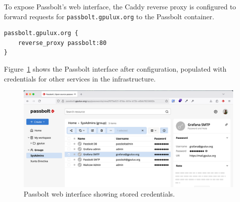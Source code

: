 To expose Passbolt's web interface, the Caddy reverse proxy is configured to forward requests for \texttt{passbolt.gpulux.org} to the Passbolt container.

\begin{lstlisting}[caption={Caddyfile configuration to reverse proxy Passbolt.}]
passbolt.gpulux.org {
    reverse_proxy passbolt:80
}
\end{lstlisting}

Figure~\ref{fig:passbolt-ui} shows the Passbolt interface after configuration, populated with credentials for other services in the infrastructure.

\begin{figure}[H]
	\centering
	\includegraphics[width=\textwidth]{imaxes/passbolt-gpulux.png}
	\caption{Passbolt web interface showing stored credentials.}
	\label{fig:passbolt-ui}
\end{figure}
